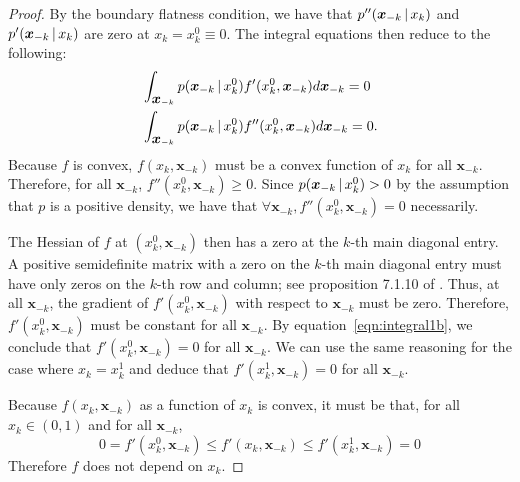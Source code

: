 \begin{proof}
By the boundary flatness condition, we have that $p''(\mbox{\boldmath $x$}_{-k}
{\,|\,} x_k)$ and $p'(\mbox{\boldmath $x$}_{-k} {\,|\,} x_k)$ are zero at $x_k =
x_k^0 \equiv 0$. The integral equations then reduce to the following:
\begin{align}
& \int_{\mbox{\boldmath $x$}_{-k}} p(\mbox{\boldmath $x$}_{-k} {\,|\,} x^0_k) f'(x^0_k, \mbox{\boldmath $x$}_{-k}) d \mbox{\boldmath $x$}_{-k}= 0 \label{eqn:integral1b} \\
& \int_{\mbox{\boldmath $x$}_{-k}} p(\mbox{\boldmath $x$}_{-k} {\,|\,} x^0_k) f''(x^0_k, \mbox{\boldmath $x$}_{-k}) d\mbox{\boldmath $x$}_{-k} = 0.
\end{align}
Because $f$ is convex, $f(x_k, \mathbf{x}_{-k})$ must be a convex
function of 
$x_k$ for all $\mathbf{x}_{-k}$. Therefore, for all $\mathbf{x}_{-k}$,
$f''(x^0_k, \mathbf{x}_{-k}) \geq 0$. Since $p(\mbox{\boldmath $x$}_{-k} {\,|\,}
x^0_k) > 0$ by the assumption that $p$ is a positive density, 
we have that $\forall \mathbf{x}_{-k}, f''(x^0_k, \mathbf{x}_{-k}) = 0$ necessarily.

The Hessian of $f$ at $(x^0_k, \mathbf{x}_{-k})$ then has a zero at
the $k$-th main diagonal entry. A positive semidefinite matrix with a
zero on the $k$-th main diagonal entry must have only zeros on the
$k$-th row and column; see proposition 7.1.10 of
\citet{HJ90}.  Thus, at all $\mathbf{x}_{-k}$, the
gradient of $f'(x^0_k, \mathbf{x}_{-k})$ with respect to
$\mathbf{x}_{-k}$ must be zero.
Therefore, $f'(x_k^0, \mathbf{x}_{-k})$ must be constant for all
$\mathbf{x}_{-k}$. By equation~\ref{eqn:integral1b}, we conclude 
that $f'(x_k^0, \mathbf{x}_{-k}) = 0$ for all $\mathbf{x}_{-k}$. We
can use the same reasoning for the case where $x_k = x_k^1$ and deduce
that $f'(x^1_k, \mathbf{x}_{-k}) = 0$ for all $\mathbf{x}_{-k}$. 

Because $f(x_k, \mathbf{x}_{-k})$ as a function of $x_k$ is convex, it must be that, for all $x_k \in (0,1)$ and for all $\mathbf{x}_{-k}$,
\begin{equation}
0 = f'(x_k^0, \mathbf{x}_{-k}) \leq f'(x_k, \mathbf{x}_{-k}) \leq 
    f'(x_k^1, \mathbf{x}_{-k}) = 0
\end{equation}
Therefore $f$ does not depend on $x_k$.


\end{proof}

